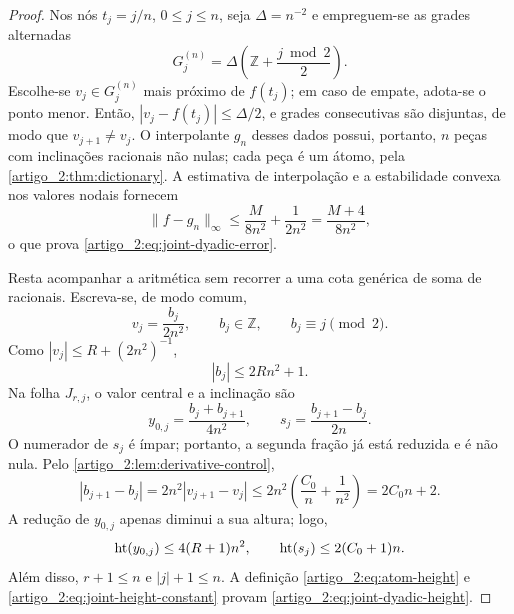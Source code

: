 \begin{proof}
Nos nós $t_j=j/n$, $0\le j\le n$, seja $\Delta=n^{-2}$ e empreguem-se as grades
alternadas
\begin{equation}
 G_j^{(n)}=\Delta\left(\mathbb Z+\frac{j\bmod2}{2}\right).
 \label{artigo_2:eq:joint-alternating-grid}
\end{equation}
Escolhe-se $v_j\in G_j^{(n)}$ mais próximo de $f(t_j)$; em caso de empate, adota-se o
ponto menor. Então, $|v_j-f(t_j)|\le\Delta/2$, e grades consecutivas são
disjuntas, de modo que $v_{j+1}\ne v_j$. O interpolante $g_n$ desses dados
possui, portanto, $n$ peças com inclinações racionais não nulas; cada peça é um
átomo, pela \cref{artigo_2:thm:dictionary}. A estimativa de interpolação e a
estabilidade convexa nos valores nodais fornecem
\[
 \|f-g_n\|_\infty
 \le\frac{M}{8n^2}+\frac{1}{2n^2}
 =\frac{M+4}{8n^2},
\]
o que prova \eqref{artigo_2:eq:joint-dyadic-error}.

Resta acompanhar a aritmética sem recorrer a uma cota genérica de soma de
racionais. Escreva-se, de modo comum,
\begin{equation}
 v_j=\frac{b_j}{2n^2},\qquad b_j\in\mathbb Z,
 \qquad b_j\equiv j\pmod2.
 \label{artigo_2:eq:joint-common-denominator}
\end{equation}
Como $|v_j|\le R+(2n^2)^{-1}$,
\begin{equation}
 |b_j|\le2Rn^2+1.
 \label{artigo_2:eq:joint-numerator-bound}
\end{equation}
Na folha $J_{r,j}$, o valor central e a inclinação são
\begin{equation}
 y_{0,j}=\frac{b_j+b_{j+1}}{4n^2},
 \qquad
 s_j=\frac{b_{j+1}-b_j}{2n}.
 \label{artigo_2:eq:joint-atom-parameters}
\end{equation}
O numerador de $s_j$ é ímpar; portanto, a segunda fração já está reduzida e é
não nula. Pelo \cref{artigo_2:lem:derivative-control},
\begin{equation}
 |b_{j+1}-b_j|
 =2n^2|v_{j+1}-v_j|
 \le2n^2\left(\frac{C_0}{n}+\frac1{n^2}\right)
 =2C_0n+2.
 \label{artigo_2:eq:joint-slope-numerator}
\end{equation}
A redução de $y_{0,j}$ apenas diminui a sua altura; logo,
\begin{equation}
 \operatorname{ht}(y_{0,j})\le4(R+1)n^2,
 \qquad
 \operatorname{ht}(s_j)\le2(C_0+1)n.
 \label{artigo_2:eq:joint-parameter-heights}
\end{equation}
Além disso, $r+1\le n$ e $|j|+1\le n$. A definição
\eqref{artigo_2:eq:atom-height} e \eqref{artigo_2:eq:joint-height-constant} provam
\eqref{artigo_2:eq:joint-dyadic-height}.


\end{proof}
